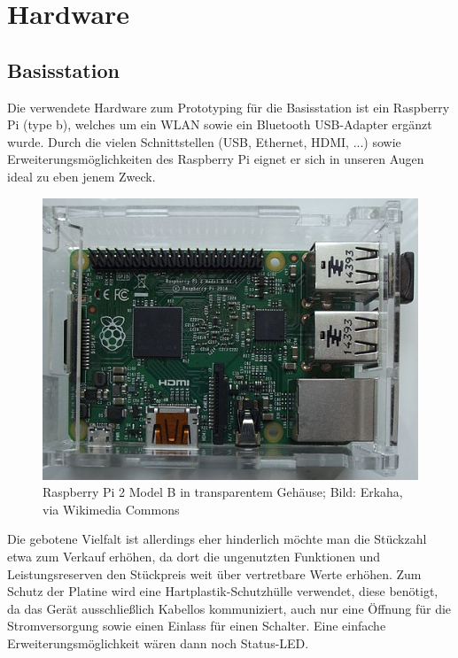 \section{Hardware}


\subsection{Basisstation}

Die verwendete Hardware zum Prototyping für die Basisstation ist ein Raspberry Pi (type b), welches um ein WLAN sowie ein Bluetooth USB-Adapter ergänzt wurde. Durch die vielen Schnittstellen (USB, Ethernet, HDMI, ...) sowie Erweiterungsmöglichkeiten des Raspberry Pi eignet er sich in unseren Augen ideal zu eben jenem Zweck. 

\begin{figure}[H] 
	\centerline{\includegraphics[width=1.0\textwidth]{Raspberry2_Model_B_im_transparenten_Gehaeuse}}
	\caption{Raspberry Pi 2 Model B in transparentem Gehäuse; Bild: Erkaha, via Wikimedia Commons}
	\label{Raspberry2_Model_B_im_transparenten_Gehaeuse}
\end{figure}

Die gebotene Vielfalt ist allerdings eher hinderlich möchte man die Stückzahl etwa zum Verkauf erhöhen, da dort die ungenutzten Funktionen und Leistungsreserven den Stückpreis weit über vertretbare Werte erhöhen.
Zum Schutz der Platine wird eine Hartplastik-Schutzhülle verwendet, diese benötigt, da das Gerät ausschließlich Kabellos kommuniziert, auch nur eine Öffnung für die Stromversorgung sowie einen Einlass für einen Schalter. Eine einfache Erweiterungsmöglichkeit wären dann noch Status-LED.

